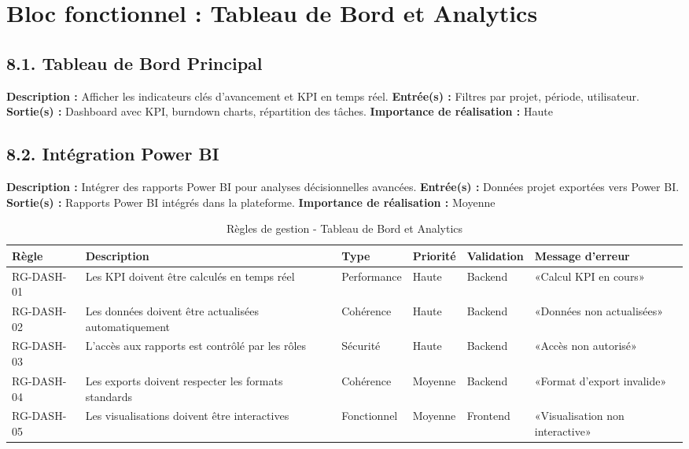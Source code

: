 \section{Bloc fonctionnel : Tableau de Bord et Analytics}

\subsection{8.1. Tableau de Bord Principal}
\textbf{Description :} Afficher les indicateurs clés d'avancement et KPI en temps réel.
\textbf{Entrée(s) :} Filtres par projet, période, utilisateur.
\textbf{Sortie(s) :} Dashboard avec KPI, burndown charts, répartition des tâches.
\textbf{Importance de réalisation :} Haute

\subsection{8.2. Intégration Power BI}
\textbf{Description :} Intégrer des rapports Power BI pour analyses décisionnelles avancées.
\textbf{Entrée(s) :} Données projet exportées vers Power BI.
\textbf{Sortie(s) :} Rapports Power BI intégrés dans la plateforme.
\textbf{Importance de réalisation :} Moyenne

\begin{table}[H]
\centering
\footnotesize
\begin{tabular}{|p{1.5cm}|p{3.5cm}|p{1.5cm}|p{1.5cm}|p{2cm}|p{2.5cm}|}
\hline
\textbf{Règle} & \textbf{Description} & \textbf{Type} & \textbf{Priorité} & \textbf{Validation} & \textbf{Message d'erreur} \\
\hline
RG-DASH-01 & Les KPI doivent être calculés en temps réel & Performance & Haute & Backend & «Calcul KPI en cours» \\
\hline
RG-DASH-02 & Les données doivent être actualisées automatiquement & Cohérence & Haute & Backend & «Données non actualisées» \\
\hline
RG-DASH-03 & L'accès aux rapports est contrôlé par les rôles & Sécurité & Haute & Backend & «Accès non autorisé» \\
\hline
RG-DASH-04 & Les exports doivent respecter les formats standards & Cohérence & Moyenne & Backend & «Format d'export invalide» \\
\hline
RG-DASH-05 & Les visualisations doivent être interactives & Fonctionnel & Moyenne & Frontend & «Visualisation non interactive» \\
\hline
\end{tabular}
\caption{Règles de gestion - Tableau de Bord et Analytics}
\label{tab:rg_dashboard}
\end{table}

